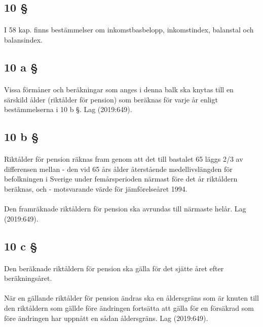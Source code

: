 \documentclass[a4paper,notitlepage,openany,10pt]{book}
\begin{document}
\subsection*{10 §}
\paragraph*{}
I 58 kap. finns bestämmelser om inkomstbasbelopp, inkomstindex, balanstal och balansindex.
\subsection*{10 a §}
\paragraph*{}
Vissa förmåner och beräkningar som anges i denna balk ska knytas till en särskild ålder (riktålder för pension) som beräknas för varje år enligt bestämmelserna i 10 b §.
Lag (2019:649).
\subsection*{10 b §}
\paragraph*{}
Riktålder för pension räknas fram genom att det till bastalet 65 läggs 2/3 av differensen mellan
\newline - den vid 65 års ålder återstående medellivslängden för befolkningen i Sverige under femårsperioden närmast före det år riktåldern beräknas, och
\newline - motsvarande värde för jämförelseåret 1994.
\paragraph*{}
Den framräknade riktåldern för pension ska avrundas till närmaste helår.
Lag (2019:649).
\subsection*{10 c §}
\paragraph*{}
Den beräknade riktåldern för pension ska gälla för det sjätte året efter beräkningsåret.
\paragraph*{}
När en gällande riktålder för pension ändras ska en åldersgräns som är knuten till den riktåldern som gällde före ändringen fortsätta att gälla för en försäkrad som före ändringen har uppnått en sådan åldersgräns.
Lag (2019:649).
\end{document}
